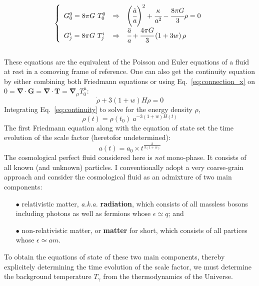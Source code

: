 \begin{equation}
\left\{
\begin{array}{lcl}
G^0_0 = 8 \pi G ~T^0_0 & \Rightarrow & \left( \cfrac{\dot{a}}{a} \right)^2 + \cfrac{\kappa}{a^2} - \cfrac{8 \pi G}{3} \rho = 0\\
G^i_j = 8 \pi G ~T^i_j & \Rightarrow & \cfrac{\ddot{a}}{a} + \cfrac{4 \pi G}{3} \left( 1+3w \right) \rho
\end{array}
\right.
\end{equation} \\ These equations are the equivalent of the Poisson and Euler equations of a fluid at rest in a comoving frame of reference. One can also get the continuity equation by either combining both Friedmann equations or using Eq.~\ref{eq:connection_x} on $0 = \pmb{\nabla \cdot G} = \pmb{\nabla \cdot T} = \pmb{\nabla}_\mu T^\mu_0$:
\begin{equation}
\label{eq:continuity}
\dot{\rho} + 3(1+w) H \rho = 0
\end{equation} Integrating Eq.~\ref{eq:continuity} to solve for the energy density $\rho$, 
\begin{equation}
\label{eq:rho}
\rho (t) = \rho (t_0) ~ a^{- 3(1+w)H(t)}
\end{equation} The first Friedmann equation along with the equation of state set the time evolution of the scale factor (heretofor undetermined):
\begin{equation}
a(t) = a_0 \times t^{\frac{2}{3 (1+w)}}
\end{equation} The cosmological perfect fluid considered here is \emph{not} mono-phase. It consists of all known (and unknown) particles. I conventionally adopt a very coarse-grain approach and consider the cosmological fluid as an admixture of two main components:\\
\begin{itemize}
\item[$\bullet$] relativistic matter, \textit{a.k.a.} \textbf{radiation}, which consists of all massless bosons including photons as well as fermions whose $\epsilon \simeq q$; and \\
\item[$\bullet$] non-relativistic matter, or \textbf{matter} for short, which consists of all partices whose $\epsilon \simeq a m$. \\
\end{itemize} To obtain the equations of state of these two main components, thereby explicitely determining the time evolution of the scale factor, we must determine the background temperature $T_\gamma$ from the thermodynamics of the Universe.

\clearpage